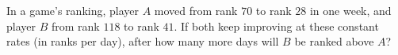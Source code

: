 In a game's ranking, player $A$ moved from rank $70$ to rank $28$ in one week, and player $B$ from rank $118$ to rank $41$. If both keep improving at these constant rates (in ranks per day), after how many more days will $B$ be ranked above $A$?
